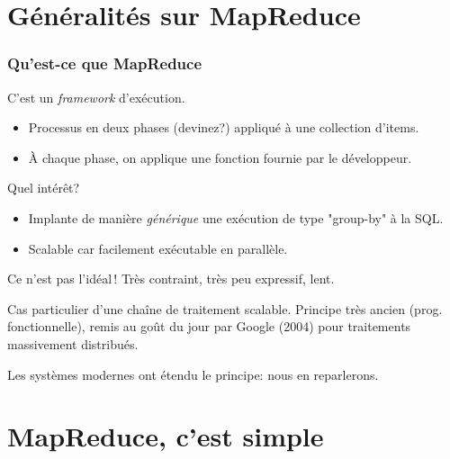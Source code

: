

\section{Généralités sur MapReduce}

\begin{frame}
\frametitle{Qu'est-ce que MapReduce}

C'est un \emph{framework} d'exécution.

\begin{itemize}
  \item Processus en deux phases (devinez?)  appliqué à une collection d'items.
  \item À chaque phase, on applique une fonction fournie par le développeur.
\end{itemize}

\vfill

Quel intérêt?

\begin{itemize}
  \item Implante de manière \emph{générique} une exécution de type "group-by" à la SQL.
  \item \alert{Scalable car facilement exécutable en parallèle}. 
\end{itemize}

\vfill

\alert{Ce n'est pas l'idéal\,!} Très contraint, très peu expressif, lent.

\vfill

Cas particulier d'une \alert{chaîne de traitement} scalable. Principe très ancien
(prog. fonctionnelle), remis au goût du jour par Google (2004) pour traitements massivement distribués. 

\vfill

Les systèmes modernes ont étendu le principe: nous en reparlerons.

\end{frame}


\section{MapReduce, c'est simple}



